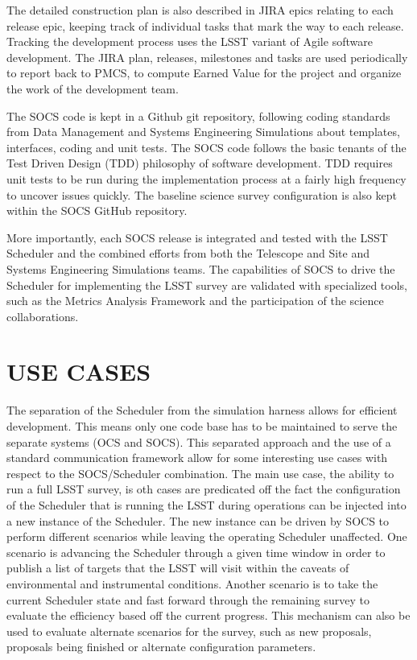 \documentclass[]{spie}  %
\begin{document}
The detailed construction plan is also described in JIRA epics relating to each release epic, keeping track of individual tasks that mark the way to each release. Tracking the development process uses the LSST variant of Agile software development\cite{Kantor_SPIE2016}. The JIRA plan, releases, milestones and tasks are used periodically to report back to PMCS, to compute Earned Value for the project and organize the work of the development team.

The SOCS code is kept in a Github\cite{GitHub} git repository, following coding standards from Data Management and Systems Engineering Simulations about templates, interfaces, coding and unit tests. The SOCS code follows the basic tenants of the Test Driven Design\cite{Beck2002}\cite{Astels2003} (TDD) philosophy of software development. TDD requires unit tests to be run during the implementation process at a fairly high frequency to uncover issues quickly. The baseline science survey configuration is also kept within the SOCS GitHub repository. 

More importantly, each SOCS release is integrated and tested with the LSST Scheduler and the combined efforts from both the Telescope and Site and Systems Engineering Simulations teams. The capabilities of SOCS to drive the Scheduler for implementing the LSST survey are validated with specialized tools, such as the Metrics Analysis Framework\cite{2014SPIE.9149E..0BJ} and the participation of the science collaborations.

\section{USE CASES}

The separation of the Scheduler from the simulation harness allows for efficient development. This means only one code base has to be maintained to serve the separate systems (OCS and SOCS). This separated approach and the use of a standard communication framework allow for some interesting use cases with respect to the SOCS/Scheduler combination. The main use case, the ability to run a full LSST survey, is oth cases are predicated off the fact the configuration of the Scheduler that is running the LSST during operations can be injected into a new instance of the Scheduler. The new instance can be driven by SOCS to perform different scenarios while leaving the operating Scheduler unaffected. One scenario is advancing the Scheduler through a given time window in order to publish a list of targets that the LSST will visit within the caveats of environmental and instrumental conditions. Another scenario is to take the current Scheduler state and fast forward through the remaining survey to evaluate the efficiency based off the current progress. This mechanism can also be used to evaluate alternate scenarios for the survey, such as new proposals, proposals being finished or alternate configuration parameters.
\end{document}
